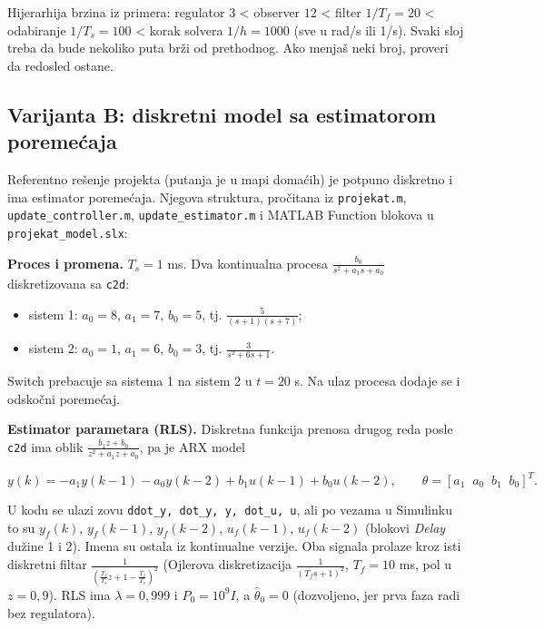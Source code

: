 \documentclass[11pt,a4paper,parskip=half,headsepline,numbers=noenddot]{scrartcl}
\begin{document}
Hijerarhija brzina iz primera: regulator \(3\) \textless{} observer \(12\) \textless{} filter \(1/T_f = 20\) \textless{} odabiranje \(1/T_s = 100\) \textless{} korak solvera \(1/h = 1000\) (sve u rad/s ili 1/s). Svaki sloj treba da bude nekoliko puta brži od prethodnog. Ako menjaš neki broj, proveri da redosled ostane.

\subsection{Varijanta B: diskretni model sa estimatorom poremećaja}

Referentno rešenje projekta (putanja je u mapi domaćih) je potpuno diskretno i ima estimator poremećaja. Njegova struktura, pročitana iz \texttt{projekat.m}, \texttt{update\_\allowbreak{}controller.m}, \texttt{update\_\allowbreak{}estimator.m} i MATLAB Function blokova u \texttt{projekat\_\allowbreak{}model.slx}:

\textbf{Proces i promena.} \(T_s = 1\) ms. Dva kontinualna procesa \(\frac{b_0}{s^2 + a_1s + a_0}\) diskretizovana sa \texttt{c2d}:

\begin{itemize}
\item sistem 1: \(a_0 = 8\), \(a_1 = 7\), \(b_0 = 5\), tj. \(\frac{5}{(s+1)(s+7)}\);
\item sistem 2: \(a_0 = 1\), \(a_1 = 6\), \(b_0 = 3\), tj. \(\frac{3}{s^2 + 6s + 1}\).
\end{itemize}

Switch prebacuje sa sistema 1 na sistem 2 u \(t = 20\) s. Na ulaz procesa dodaje se i odskočni poremećaj.

\textbf{Estimator parametara (RLS).} Diskretna funkcija prenosa drugog reda posle \texttt{c2d} ima oblik \(\frac{b_1z + b_0}{z^2 + a_1z + a_0}\), pa je ARX model

\[y(k) = -a_1y(k-1) - a_0y(k-2) + b_1u(k-1) + b_0u(k-2),\qquad \theta = [a_1\;\; a_0\;\; b_1\;\; b_0]^T .\]

U kodu se ulazi zovu \texttt{ddot\_\allowbreak{}y,\allowbreak{}\ dot\_\allowbreak{}y,\allowbreak{}\ y,\allowbreak{}\ dot\_\allowbreak{}u,\allowbreak{}\ u}, ali po vezama u Simulinku to su \(y_f(k)\), \(y_f(k-1)\), \(y_f(k-2)\), \(u_f(k-1)\), \(u_f(k-2)\) (blokovi \emph{Delay} dužine 1 i 2). Imena su ostala iz kontinualne verzije. Oba signala prolaze kroz isti diskretni filtar \(\frac{1}{\left(\frac{T_f}{T_s}z + 1 - \frac{T_f}{T_s}\right)^2}\) (Ojlerova diskretizacija \(\frac{1}{(T_fs+1)^2}\), \(T_f = 10\) ms, pol u \(z = 0{,}9\)). RLS ima \(\lambda = 0{,}999\) i \(P_0 = 10^9I\), a \(\hat\theta_0 = 0\) (dozvoljeno, jer prva faza radi bez regulatora).
\end{document}
